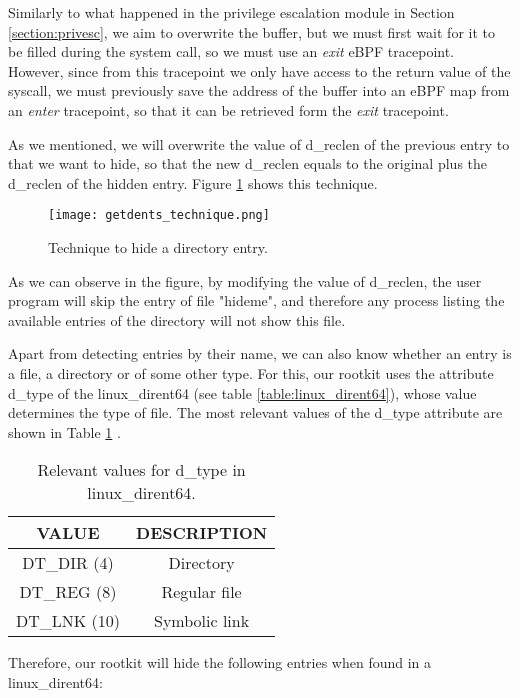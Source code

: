 Similarly to what happened in the privilege escalation module in Section \ref{section:privesc}, we aim to overwrite the buffer, but we must first wait for it to be filled during the system call, so we must use an \textit{exit} eBPF tracepoint. However, since from this tracepoint we only have access to the return value of the syscall, we must previously save the address of the buffer into an eBPF map from an \textit{enter} tracepoint, so that it can be retrieved form the \textit{exit} tracepoint. 

As we mentioned, we will overwrite the value of d\_reclen of the previous entry to that we want to hide, so that the new d\_reclen equals to the original plus the d\_reclen of the hidden entry. Figure \ref{fig:getdents_technique} shows this technique.

\begin{figure}[htbp]
	\centering
	\texttt{[image: getdents\_technique.png]}
	\caption{Technique to hide a directory entry.}
	\label{fig:getdents_technique}
\end{figure}

As we can observe in the figure, by modifying the value of d\_reclen, the user program will skip the entry of file "hideme", and therefore any process listing the available entries of the directory will not show this file.

Apart from detecting entries by their name, we can also know whether an entry is a file, a directory or of some other type. For this, our rootkit uses the attribute d\_type of the linux\_dirent64 (see table \ref{table:linux_dirent64}), whose value determines the type of file. The most relevant values of the d\_type attribute are shown in Table \ref{table:dtype_values} \cite{dtype_dirent}.

\begin{table}[htbp]
\begin{tabular}{|c|c|}
\hline
\textbf{VALUE} & \textbf{DESCRIPTION} \\
\hline
\hline
DT\_DIR (4) & Directory\\
\hline
DT\_REG (8) & Regular file\\
\hline
DT\_LNK (10) & Symbolic link\\
\hline
\end{tabular}
\caption{Relevant values for d\_type in linux\_dirent64.}
\label{table:dtype_values}
\end{table}

Therefore, our rootkit will hide the following entries when found in a linux\_dirent64:

